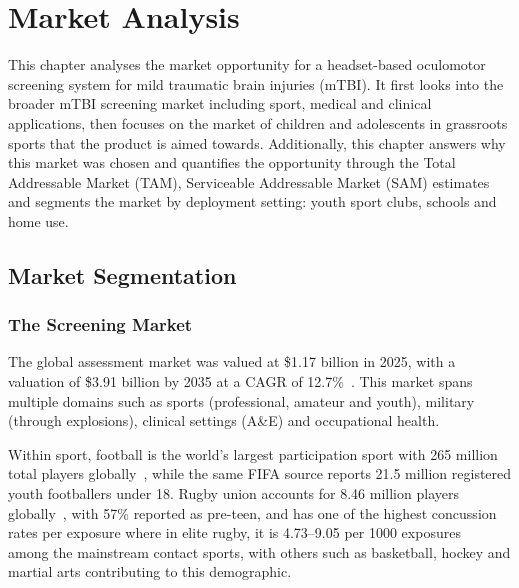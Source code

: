 \chapter{Market Analysis}
\label{chapter:ent-market}



This chapter analyses the market opportunity for a headset-based oculomotor screening system for mild traumatic brain injuries (mTBI). It first looks into the broader mTBI screening market including sport, medical and clinical applications, then focuses on the market of children and adolescents in grassroots sports that the product is aimed towards. Additionally, this chapter answers why this market was chosen and quantifies the opportunity through the Total Addressable Market (TAM), Serviceable Addressable Market (SAM) estimates and segments the market by deployment setting: youth sport clubs, schools and home use.  


\section{Market Segmentation}
\label{sec:ent-market-analysis}

\subsection{The  Screening Market}

The global  assessment market was valued at \$1.17 billion in 2025, with a valuation of \$3.91 billion by 2035 at a CAGR of 12.7\%~\cite{businessresearchinsights2025tbi}. This market spans multiple domains such as sports (professional, amateur and youth), military (through explosions), clinical settings (A\&E) and occupational health.

Within sport, football is the world's largest participation sport with 265 million total players globally~\cite{fifa2007bigcount}, while the same FIFA source reports 21.5 million registered youth footballers under 18. Rugby union accounts for 8.46 million players globally~\cite{worldrugby2023participation}, with 57\% reported as pre-teen, and has one of the highest concussion rates per exposure where in elite rugby, it is 4.73--9.05 per 1000 exposures~\cite{gardner2014rugbyconcussion,rafferty2019rugbyconcussion} among the mainstream contact sports, with others such as basketball, hockey and martial arts contributing to this demographic.

